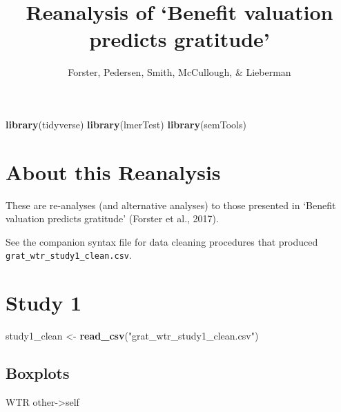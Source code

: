 \documentclass[
]{article}
\title{Reanalysis of `Benefit valuation predicts gratitude'}
\author{Forster, Pedersen, Smith, McCullough, \& Lieberman}
\date{}
\newenvironment{Shaded}{\begin{snugshade}}{\end{snugshade}}
\newcommand{\FunctionTok}[1]{\textcolor[rgb]{0.13,0.29,0.53}{\textbf{#1}}}
\newcommand{\NormalTok}[1]{#1}
\newcommand{\OtherTok}[1]{\textcolor[rgb]{0.56,0.35,0.01}{#1}}
\newcommand{\StringTok}[1]{\textcolor[rgb]{0.31,0.60,0.02}{#1}}
\begin{document}
\maketitle

\begin{Shaded}
\begin{Highlighting}[]
\FunctionTok{library}\NormalTok{(tidyverse)}
\FunctionTok{library}\NormalTok{(lmerTest)}
\FunctionTok{library}\NormalTok{(semTools)}
\end{Highlighting}
\end{Shaded}

\hypertarget{about-this-reanalysis}{%
\section{About this Reanalysis}\label{about-this-reanalysis}}

These are re-analyses (and alternative analyses) to those presented in
`Benefit valuation predicts gratitude' (Forster et al., 2017).

See the companion syntax file for data cleaning procedures that produced
\texttt{grat\_wtr\_study1\_clean.csv}.

\hypertarget{study-1}{%
\section{Study 1}\label{study-1}}

\begin{Shaded}
\begin{Highlighting}[]
\NormalTok{study1\_clean }\OtherTok{\textless{}{-}} \FunctionTok{read\_csv}\NormalTok{(}\StringTok{"grat\_wtr\_study1\_clean.csv"}\NormalTok{)}
\end{Highlighting}
\end{Shaded}

\hypertarget{boxplots}{%
\subsection{Boxplots}\label{boxplots}}

WTR other-\textgreater self
\end{document}

